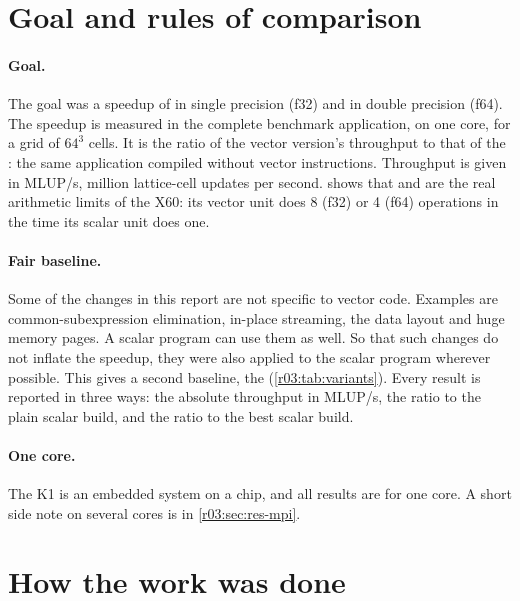 \section{Goal and rules of comparison}\label{r03:sec:goal}

\paragraph{Goal.} The goal was a speedup of  in single precision (f32) and  in
double precision (f64). The speedup is measured in the complete benchmark application, on
one core, for a grid of $64^3$ cells. It is the ratio of the vector version's throughput to
that of the : the same application compiled without vector
instructions. Throughput is given in MLUP/s, million lattice-cell updates per second.
 shows that  and  are the real arithmetic limits of the
X60: its vector unit does 8 (f32) or 4 (f64) operations in the time its scalar unit does one.

\paragraph{Fair baseline.} Some of the changes in this report are not specific to vector
code. Examples are common-subexpression elimination, in-place streaming, the data layout
and huge memory pages. A scalar program can use them as well. So that such changes do not
inflate the speedup, they were also applied to the scalar program wherever possible. This
gives a second baseline, the  (\cref{r03:tab:variants}). Every
result is reported in three ways: the absolute throughput in MLUP/s, the ratio to the plain
scalar build, and the ratio to the best scalar build.

\paragraph{One core.} The K1 is an embedded system on a chip, and all results are for one
core. A short side note on several cores is in \cref{r03:sec:res-mpi}.

\section{How the work was done}\label{r03:sec:method}

